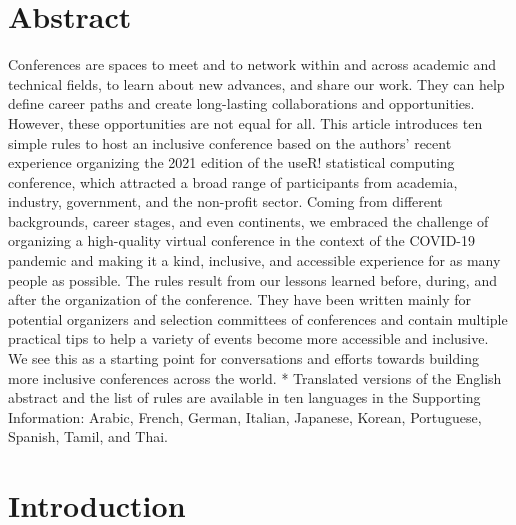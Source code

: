 \documentclass[10pt,letterpaper]{article}
\begin{document}
\section*{Abstract}

Conferences are spaces to meet and to network within and across academic and technical fields, to learn about new advances, and share our work. They can help define career paths and create long-lasting collaborations and opportunities. 
However, these opportunities are not equal for all. 
This article introduces ten simple rules to host an inclusive conference based on the authors' recent experience organizing the 2021 edition of the useR! statistical computing conference, which attracted a broad range of participants from academia, industry, government, and the non-profit sector. 
Coming from different backgrounds, career stages, and even continents, we embraced the challenge of organizing a high-quality virtual conference in the context of the COVID-19 pandemic and making it a kind, inclusive, and accessible experience for as many people as possible.
The rules result from our lessons learned before, during, and after the organization of the conference. 
They have been written mainly for potential organizers and selection committees of conferences and contain multiple practical tips to help a variety of events become more accessible and inclusive. We see this as a starting point for conversations and efforts towards building more inclusive conferences across the world.
* Translated versions of the English abstract and the list of rules are available in ten languages in the Supporting Information: Arabic, French, German, Italian, Japanese, Korean, Portuguese, Spanish, Tamil, and Thai.


\linenumbers

\section*{Introduction}
\end{document}
